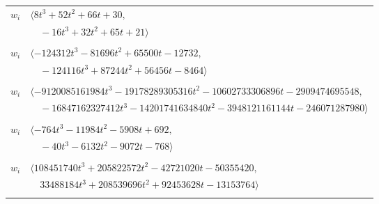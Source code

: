 \documentclass[11pt]{article}
\begin{document}
\begin{longtable}{@{}ll@{}}
$w_i$ & $\langle 8t^{3}+52t^{2}+66t+30,$\\
 & $\quad -16t^{3}+32t^{2}+65t+21\rangle$\\
\addlinespace[2pt]
\multicolumn{2}{@{}p{0.97\textwidth}@{}}{$i=3$, $D_i=512$, $\rho_{ij}$: $2{:}1, \allowbreak 11{:}2, \allowbreak 34{:}1, \allowbreak 42{:}2, \allowbreak 51{:}2, \allowbreak 56{:}2, \allowbreak 59{:}2, \allowbreak 61{:}1, \allowbreak 64{:}2, \allowbreak 65{:}1$}\\
$w_i$ & $\langle -124312t^{3}-81696t^{2}+65500t-12732,$\\
 & $\quad -124116t^{3}+87244t^{2}+56456t-8464\rangle$\\
\addlinespace[2pt]
\multicolumn{2}{@{}p{0.97\textwidth}@{}}{$i=4$, $D_i=8388608$, $\rho_{ij}$: $0{:}2, \allowbreak 2{:}1, \allowbreak 8{:}2, \allowbreak 9{:}2, \allowbreak 17{:}2, \allowbreak 23{:}2, \allowbreak 24{:}2, \allowbreak 25{:}1, \allowbreak 27{:}2, \allowbreak 28{:}1, \allowbreak 32{:}2, \allowbreak 36{:}1, \allowbreak 43{:}1, \allowbreak 58{:}1, \allowbreak 59{:}1, \allowbreak 65{:}2, \allowbreak 66{:}2, \allowbreak 75{:}2$}\\
$w_i$ & $\langle -9120085161984t^{3}-19178289305316t^{2}-10602733306896t-2909474695548,$\\
 & $\quad -16847162327412t^{3}-14201741634840t^{2}-3948121161144t-246071287980\rangle$\\
\addlinespace[2pt]
\multicolumn{2}{@{}p{0.97\textwidth}@{}}{$i=5$, $D_i=512$, $\rho_{ij}$: $2{:}2, \allowbreak 16{:}2, \allowbreak 18{:}2, \allowbreak 22{:}1, \allowbreak 36{:}1, \allowbreak 60{:}2, \allowbreak 62{:}1, \allowbreak 72{:}2, \allowbreak 74{:}1$}\\
$w_i$ & $\langle -764t^{3}-11984t^{2}-5908t+692,$\\
 & $\quad -40t^{3}-6132t^{2}-9072t-768\rangle$\\
\addlinespace[2pt]
\multicolumn{2}{@{}p{0.97\textwidth}@{}}{$i=6$, $D_i=524288$, $\rho_{ij}$: $0{:}1, \allowbreak 14{:}1, \allowbreak 15{:}2, \allowbreak 20{:}1, \allowbreak 21{:}1, \allowbreak 22{:}2, \allowbreak 25{:}2, \allowbreak 29{:}1, \allowbreak 30{:}2, \allowbreak 35{:}1, \allowbreak 44{:}1, \allowbreak 45{:}1, \allowbreak 48{:}2, \allowbreak 53{:}1, \allowbreak 57{:}2, \allowbreak 66{:}2, \allowbreak 77{:}2$}\\
$w_i$ & $\langle 108451740t^{3}+205822572t^{2}-42721020t-50355420,$\\
 & $\quad 33488184t^{3}+208539696t^{2}+92453628t-13153764\rangle$\\
\addlinespace[2pt]

\end{longtable}
\end{document}
